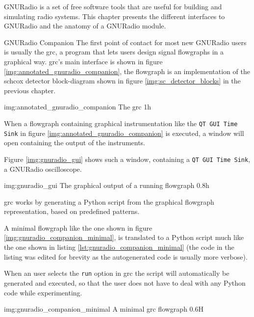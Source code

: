 GNURadio \cite{gnuradioweb} is a set of free software \cite{fsffreeweb}
tools that are useful for building and simulating radio systems.
This chapter presents the different interfaces to GNURadio
and the anatomy of a GNURadio module.

\begin{subchapter}{GNURadio Companion}
  The first point of contact for most new GNURadio users
  is usually the \gls{grc}, a program that lets
  users design signal flowgraphs in a graphical way.
  \Gls{grc}'s main interface is shown in figure
  \ref{img:annotated_gnuradio_companion}, the flowgraph
  is an implementation of the \acrlong{schcox} detector block-diagram
  shown in figure \ref{img:sc_detector_blocks} in the previous
  chapter.

               {img:annotated_gnuradio_companion}
               {The \acrlong{grc}}
               {1}{h}

  When a flowgraph containing graphical instrumentation like
  the \texttt{QT GUI Time Sink} in figure \ref{img:annotated_gnuradio_companion}
  is executed, a window will open containing the output of
  the instruments.

  Figure \ref{img:gnuradio_gui} shows such a window, containing
  a \texttt{QT GUI Time Sink}, a GNURadio oscilloscope.

                  {img:gnuradio_gui}
                  {The graphical output of a running flowgraph}
                  {0.8}{h}

  \Gls{grc} works by generating a Python script from the
  graphical flowgraph representation, based on predefined
  patterns.

  A minimal flowgraph like the one shown in figure
  \ref{img:gnuradio_companion_minimal}, is translated
  to a Python script much like the one shown in
  listing \ref{lst:gnuradio_companion_minimal}
  (the code in the listing was edited for brevity
  as the autogenerated code is usually more verbose).

  When an user selects the \texttt{run} option in \gls{grc}
  the script will automatically be generated and executed,
  so that the user does not have to deal with any Python
  code while experimenting.

                  {img:gnuradio_companion_minimal}
                  {A minimal \gls{grc} flowgraph}
                  {0.6}{H}
\end{subchapter}

